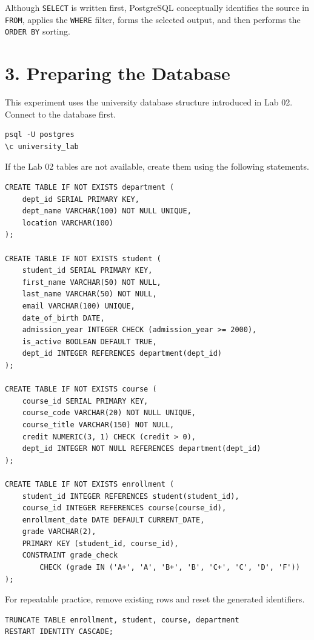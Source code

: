 \documentclass[12pt,a4paper]{article}
\begin{document}
Although \texttt{SELECT} is written first, PostgreSQL conceptually identifies the source in
\texttt{FROM}, applies the \texttt{WHERE} filter, forms the selected output, and then performs the
\texttt{ORDER BY} sorting.

\section*{3. Preparing the Database}
This experiment uses the university database structure introduced in Lab 02. Connect to the
database first.

\begin{verbatim}
psql -U postgres
\c university_lab
\end{verbatim}

If the Lab 02 tables are not available, create them using the following statements.

\begin{verbatim}
CREATE TABLE IF NOT EXISTS department (
    dept_id SERIAL PRIMARY KEY,
    dept_name VARCHAR(100) NOT NULL UNIQUE,
    location VARCHAR(100)
);

CREATE TABLE IF NOT EXISTS student (
    student_id SERIAL PRIMARY KEY,
    first_name VARCHAR(50) NOT NULL,
    last_name VARCHAR(50) NOT NULL,
    email VARCHAR(100) UNIQUE,
    date_of_birth DATE,
    admission_year INTEGER CHECK (admission_year >= 2000),
    is_active BOOLEAN DEFAULT TRUE,
    dept_id INTEGER REFERENCES department(dept_id)
);

CREATE TABLE IF NOT EXISTS course (
    course_id SERIAL PRIMARY KEY,
    course_code VARCHAR(20) NOT NULL UNIQUE,
    course_title VARCHAR(150) NOT NULL,
    credit NUMERIC(3, 1) CHECK (credit > 0),
    dept_id INTEGER NOT NULL REFERENCES department(dept_id)
);

CREATE TABLE IF NOT EXISTS enrollment (
    student_id INTEGER REFERENCES student(student_id),
    course_id INTEGER REFERENCES course(course_id),
    enrollment_date DATE DEFAULT CURRENT_DATE,
    grade VARCHAR(2),
    PRIMARY KEY (student_id, course_id),
    CONSTRAINT grade_check
        CHECK (grade IN ('A+', 'A', 'B+', 'B', 'C+', 'C', 'D', 'F'))
);
\end{verbatim}

For repeatable practice, remove existing rows and reset the generated identifiers.

\begin{verbatim}
TRUNCATE TABLE enrollment, student, course, department
RESTART IDENTITY CASCADE;
\end{verbatim}
\end{document}
